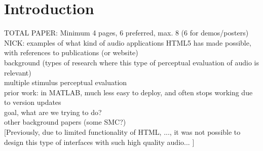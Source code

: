 \documentclass{article}
\title{\papertitle}
\begin{document}
%
\capstartfalse
\maketitle
\capstarttrue
%
\begin{abstract}
New functionality in HTML5, notably its Web Audio API, allow for increasingly powerful applications in the browser. %
Perceptual evaluation tests for audio, where the subject assesses certain qualities of different audio fragments through a graphical user interface and/or text boxes, require playback of audio and rapid switching between different files. %
The advantage of a web application is easy deployment on any platform, without requiring any other application or library, easy storing of results on a server. 
[...]

\end{abstract}
%

\section{Introduction}\label{sec:introduction}
TOTAL PAPER: Minimum 4 pages, 6 preferred, max. 8 (6 for demos/posters)\\ 

NICK: examples of what kind of audio applications HTML5 has made possible, with references to publications (or website)\\

background (types of research where this type of perceptual evaluation of audio is relevant)\\

multiple stimulus perceptual evaluation \cite{bech}\\

prior work: \cite{deman2014b} in MATLAB, much less easy to deploy, and often stops working due to version updates \\ 

goal, what are we trying to do? \\

other background papers (some SMC?)\\

[Previously, due to limited functionality of HTML, ..., it was not possible to design this type of interfaces with such high quality audio... ]
\end{document}
